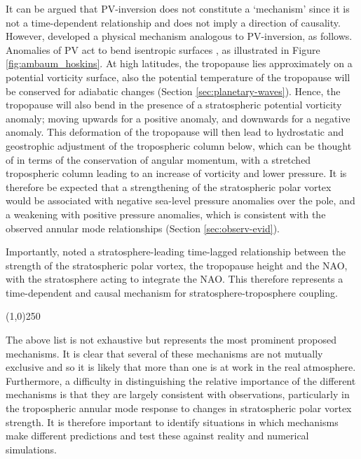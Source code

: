 It can be argued that PV-inversion does not constitute a `mechanism' since it is
not a time-dependent relationship and does not imply a direction of
causality. However, \citet{Ambaum2002} developed a physical mechanism analogous
to PV-inversion, as follows. Anomalies of PV act to bend isentropic surfaces
\citep{Hoskins1985}, as illustrated in Figure \ref{fig:ambaum_hoskins}. At high
latitudes, the tropopause lies approximately on a potential vorticity surface,
also the potential temperature of the tropopause will be conserved for adiabatic
changes (Section \ref{sec:planetary-waves}). Hence, the tropopause will also
bend in the presence of a stratospheric potential vorticity anomaly; moving
upwards for a positive anomaly, and downwards for a negative anomaly. This
deformation of the tropopause will then lead to hydrostatic and geostrophic
adjustment of the tropospheric column below, which can be thought of in terms of
the conservation of angular momentum, with a stretched tropospheric column
leading to an increase of vorticity and lower pressure. It is therefore be
expected that a strengthening of the stratospheric polar vortex would be
associated with negative sea-level pressure anomalies over the pole, and a
weakening with positive pressure anomalies, which is consistent with the
observed annular mode relationships (Section \ref{sec:observ-evid}).

Importantly, \citet{Ambaum2002} noted a stratosphere-leading time-lagged
relationship between the strength of the stratospheric polar vortex, the
tropopause height and the NAO, with the stratosphere acting to integrate the
NAO. This therefore represents a time-dependent and causal mechanism for
stratosphere-troposphere coupling.
\begin{center}
\line(1,0){250}
\end{center}

\bigskip The above list is not exhaustive but represents the most prominent
proposed mechanisms. It is clear that several of these mechanisms are not
mutually exclusive and so it is likely that more than one is at work in the real
atmosphere. Furthermore, a difficulty in distinguishing the relative importance
of the different mechanisms is that they are largely consistent with
observations, particularly in the tropospheric annular mode response to changes
in stratospheric polar vortex strength. It is therefore important to identify
situations in which mechanisms make different predictions and test these against
reality and numerical simulations.

